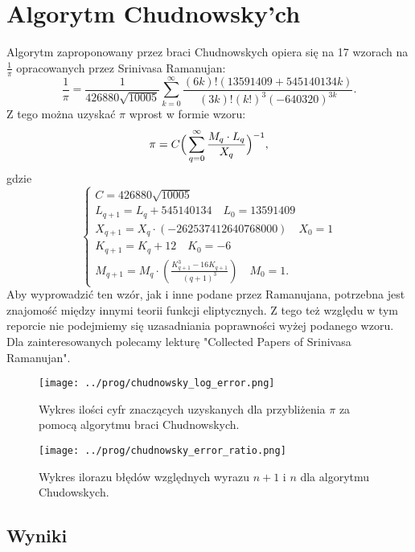 \section{Algorytm Chudnowsky'ch}

Algorytm zaproponowany przez braci Chudnowskych opiera się na 17 wzorach na $\frac1\pi$ opracowanych przez Srinivasa Ramanujan\cite{review}:
$${\frac {1}{\pi }}={\frac {1}{426880{\sqrt {10005}}}}\sum _{k=0}^{\infty }{\frac {(6k)!(13591409+545140134k)}{(3k)!(k!)^{3}(-640320)^{3k}}}.$$
Z tego można uzyskać $\pi$ wprost w formie wzoru:
$$\pi=C\Big(\sum\limits_{q=0}^\infty{M_q\cdot L_q\over X_q}\Big)^{-1},$$
gdzie 
$$
\begin{cases}
    C=426880\sqrt{10005}\\
    L_{q+1}=L_q+545140134 \quad L_0=13591409  \\
    X_{q+1}=X_q\cdot(-262537412640768000)\quad X_0=1\\
    K_{q+1}=K_q+12\quad K_0=-6\\
    M_{q+1}=M_{q}\cdot \left({\frac {K_{q+1}^{3}-16K_{q+1}}{\left(q+1\right)^{3}}}\right)\quad M_{0}=1.
\end{cases}
$$
Aby wyprowadzić ten wzór, jak i inne podane przez Ramanujana, potrzebna jest znajomość między innymi teorii funkcji eliptycznych\cite{review}. Z tego też względu w tym reporcie nie podejmiemy się uzasadniania poprawności wyżej podanego wzoru. Dla zainteresowanych polecamy lekturę "Collected Papers of Srinivasa Ramanujan"\cite{ramanujan}.

\begin{figure}[!h]
    \centering
    \renewcommand{\figurename}{Wykres}
    \texttt{[image: ../prog/chudnowsky\_log\_error.png]}
    \caption{Wykres ilości cyfr znaczących uzyskanych dla  przybliżenia  $\pi$ za pomocą algorytmu braci Chudnowskych.}
    \label{chudnowsky-error}
\end{figure}

\begin{figure}[!h]
    \centering
    \renewcommand{\figurename}{Wykres}
    \texttt{[image: ../prog/chudnowsky\_error\_ratio.png]}
    \caption{Wykres ilorazu błędów względnych wyrazu $n+1$ i $n$ dla algorytmu Chudowskych.}
    \label{chudnowsky-convergence}
\end{figure}

\subsection{Wyniki}

